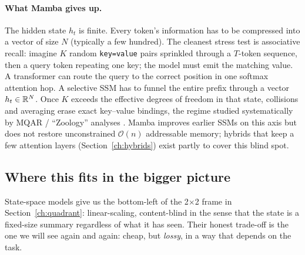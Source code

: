 \paragraph{What Mamba gives up.} The hidden state \(h_t\) is finite.
Every token's information has to be compressed into a vector of size
\(N\) (typically a few hundred). The cleanest stress test is associative
recall: imagine \(K\) random \texttt{key=value} pairs sprinkled through
a \(T\)-token sequence, then a query token repeating one key; the model
must emit the matching value. A transformer can route the query to the
correct position in one softmax attention hop. A selective SSM has to
funnel the entire prefix through a vector \(h_t \in \mathbb{R}^{N}\). Once \(K\)
exceeds the effective degrees of freedom in that state, collisions and
averaging erase exact key–value bindings, the regime studied
systematically by MQAR / ``Zoology'' analyses
\citep{arora2024zoology}. Mamba improves earlier SSMs on this axis but
does not restore unconstrained \(\mathcal{O}(n)\) addressable memory;
hybrids that keep a few attention layers (Section~\ref{ch:hybrids})
exist partly to cover this blind spot.


\subsection{Where this fits in the bigger picture}

State-space models give us the bottom-left of the 2$\times$2 frame in
Section~\ref{ch:quadrant}: linear-scaling, content-blind in the sense
that the state is a fixed-size summary regardless of what it has seen.
Their honest trade-off is the one we will see again and again: cheap, but
\emph{lossy}, in a way that depends on the task.
